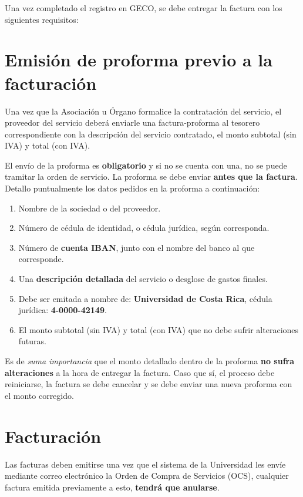 \documentclass[12pt]{article}
\begin{document}
Una vez completado el registro en GECO, se debe entregar la factura con los siguientes requisitos:

\section{Emisión de proforma previo a la facturación}

Una vez que la Asociación u Órgano formalice la contratación del servicio, el proveedor del servicio deberá enviarle una factura-proforma al tesorero correspondiente con la descripción del servicio contratado, el monto subtotal (sin IVA) y total (con IVA).\par 
El envío de la proforma es \textbf{obligatorio} y si no se cuenta con una, no se puede tramitar la orden de servicio. La proforma se debe enviar \textbf{antes que la factura}. Detallo puntualmente los datos pedidos en la proforma a continuación:

\begin{enumerate}
    \item Nombre de la sociedad o del proveedor.
    \item Número de cédula de identidad, o cédula jurídica, según corresponda.
    \item Número de \textbf{cuenta IBAN}, junto con el nombre del banco al que corresponde.
    \item Una \textbf{descripción detallada} del servicio o desglose de gastos finales.
    \item Debe ser emitada a nombre de: \textbf{Universidad de Costa Rica}, cédula jurídica: \textbf{4-0000-42149}.
    \item El monto subtotal (sin IVA) y total (con IVA) que no debe sufrir alteraciones futuras.
\end{enumerate}

Es de \emph{suma importancia} que el monto detallado dentro de la proforma \textbf{no sufra alteraciones} a la hora de entregar la factura. Caso que sí, el proceso debe reiniciarse, la factura se debe cancelar y se debe enviar una nueva proforma con el monto corregido. 

\section{Facturación}

Las facturas deben emitirse una vez que el sistema de la Universidad les envíe mediante correo
electrónico la Orden de Compra de Servicios (OCS), cualquier factura emitida previamente a esto, \textbf{tendrá que anularse}.\par  
\end{document}
